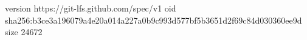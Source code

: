 version https://git-lfs.github.com/spec/v1
oid sha256:b3ce3a196079a4e20a014a227a0b9c993d577bf5b3651d2f69c84d030360ee9d
size 24672
